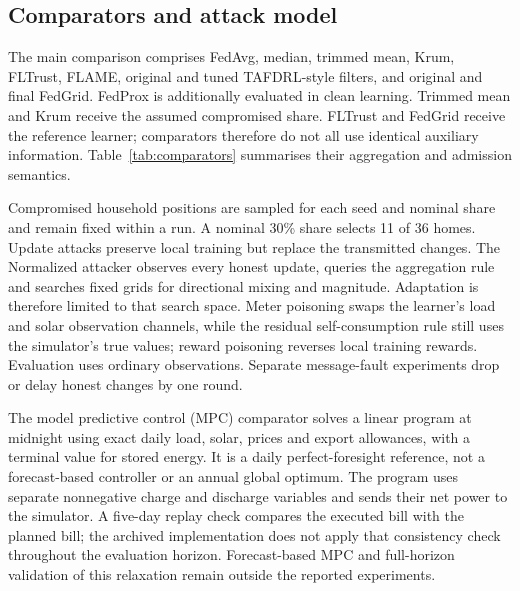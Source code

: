 \subsection{Comparators and attack model}
The main comparison comprises FedAvg, median, trimmed mean, Krum, FLTrust, FLAME, original and tuned TAFDRL-style filters, and original and final FedGrid. FedProx is additionally evaluated in clean learning. Trimmed mean and Krum receive the assumed compromised share. FLTrust and FedGrid receive the reference learner; comparators therefore do not all use identical auxiliary information. Table~\ref{tab:comparators} summarises their aggregation and admission semantics.


Compromised household positions are sampled for each seed and nominal share and remain fixed within a run. A nominal 30\% share selects 11 of 36 homes. Update attacks preserve local training but replace the transmitted changes. The Normalized attacker observes every honest update, queries the aggregation rule and searches fixed grids for directional mixing and magnitude. Adaptation is therefore limited to that search space. Meter poisoning swaps the learner's load and solar observation channels, while the residual self-consumption rule still uses the simulator's true values; reward poisoning reverses local training rewards. Evaluation uses ordinary observations. Separate message-fault experiments drop or delay honest changes by one round.


The model predictive control (MPC) comparator solves a linear program at midnight using exact daily load, solar, prices and export allowances, with a terminal value for stored energy. It is a daily perfect-foresight reference, not a forecast-based controller or an annual global optimum. The program uses separate nonnegative charge and discharge variables and sends their net power to the simulator. A five-day replay check compares the executed bill with the planned bill; the archived implementation does not apply that consistency check throughout the evaluation horizon. Forecast-based MPC and full-horizon validation of this relaxation remain outside the reported experiments.
